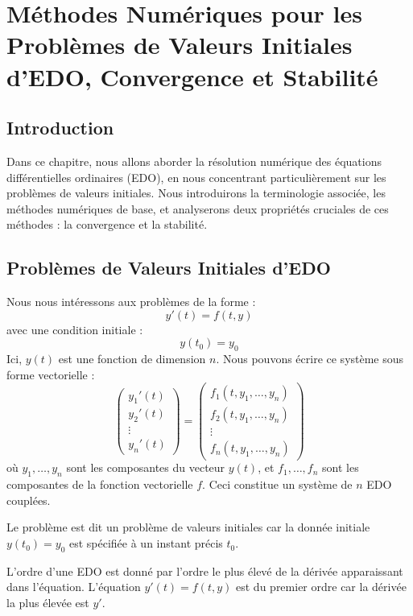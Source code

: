 \documentclass{article}
\begin{document}
\sloppy

\section*{Méthodes Numériques pour les Problèmes de Valeurs Initiales d'EDO, Convergence et Stabilité}

\subsection*{Introduction}
Dans ce chapitre, nous allons aborder la résolution numérique des équations différentielles ordinaires (EDO), en nous concentrant particulièrement sur les problèmes de valeurs initiales. Nous introduirons la terminologie associée, les méthodes numériques de base, et analyserons deux propriétés cruciales de ces méthodes : la convergence et la stabilité.

\subsection*{Problèmes de Valeurs Initiales d'EDO}

Nous nous intéressons aux problèmes de la forme :
\[ y'(t) = f(t, y) \]
avec une condition initiale :
\[ y(t_0) = y_0 \]
Ici, $y(t)$ est une fonction de dimension $n$. Nous pouvons écrire ce système sous forme vectorielle :
\[ \begin{pmatrix} y_1'(t) \\ y_2'(t) \\ \vdots \\ y_n'(t) \end{pmatrix} = \begin{pmatrix} f_1(t, y_1, \dots, y_n) \\ f_2(t, y_1, \dots, y_n) \\ \vdots \\ f_n(t, y_1, \dots, y_n) \end{pmatrix} \]
où $y_1, \dots, y_n$ sont les composantes du vecteur $y(t)$, et $f_1, \dots, f_n$ sont les composantes de la fonction vectorielle $f$. Ceci constitue un système de $n$ EDO couplées.

Le problème est dit un problème de valeurs initiales car la donnée initiale $y(t_0) = y_0$ est spécifiée à un instant précis $t_0$.

L'ordre d'une EDO est donné par l'ordre le plus élevé de la dérivée apparaissant dans l'équation. L'équation $y'(t) = f(t, y)$ est du premier ordre car la dérivée la plus élevée est $y'$.
\end{document}
